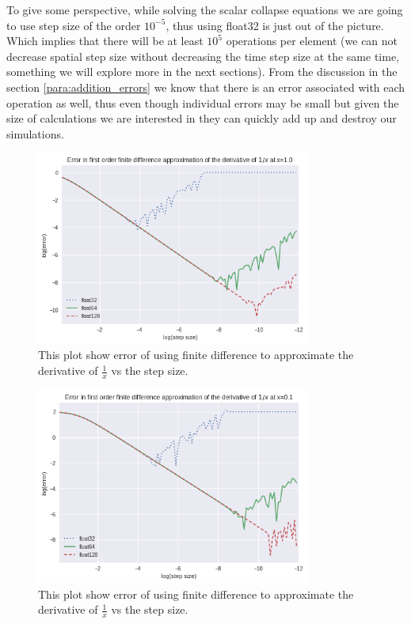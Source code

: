 To give some perspective, while solving the scalar collapse equations we are going to use step size of the order $10^{-5}$, thus using float32 is just out of the picture. Which implies that there will be at least $10^{5}$ operations per element (we can not decrease spatial step size without decreasing the time step size at the same time, something we will explore more in the next sections). From the discussion in the section \ref{para:addition_errors} we know that there is an error associated with each operation as well, thus even though individual errors may be small but given the size of calculations we are interested in they can quickly add up and destroy our simulations.







\begin{figure}[hbt!]
    \centering
    \includegraphics[width=0.8\textwidth]{images/1_x_error_at_1.png}
    \caption{This plot show error of using finite difference to approximate the derivative of $\frac{1}{x}$ vs the step size.}\label{fig:1/x_1}
\end{figure}

\begin{figure}[hbt!]
    \centering
    \includegraphics[width=0.8\textwidth]{images/1_x_error_at_p1.png}
    \caption{This plot show error of using finite difference to approximate the derivative of $\frac{1}{x}$ vs the step size.}\label{fig:1/x_0.1}
\end{figure}


